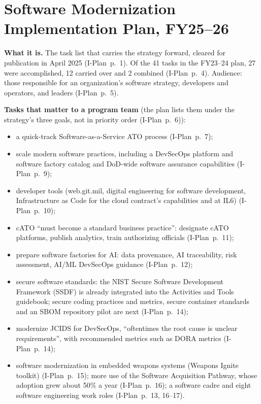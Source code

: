 \documentclass[11pt,letterpaper,twoside,openany]{memoir}
\newcommand{\pg}[2]{{\small(#1~p.~#2)}}          %
\begin{document}
\section{Software Modernization Implementation Plan, FY25--26}
\textbf{What it is.} The task list that carries the strategy forward, cleared for publication in April 2025
\pg{I-Plan}{1}. Of the 41 tasks in the FY23--24 plan, 27 were accomplished, 12 carried over and 2 combined
\pg{I-Plan}{4}. Audience: those responsible for an organization's software strategy, developers and operators, and
leaders \pg{I-Plan}{5}.

\textbf{Tasks that matter to a program team} (the plan lists them under the strategy's three goals, not in priority
order \pg{I-Plan}{6}):
\begin{itemize}
\item a quick-track Software-as-a-Service ATO process \pg{I-Plan}{7};
\item scale modern software practices, including a DevSecOps platform and software factory catalog and DoD-wide
  software assurance capabilities \pg{I-Plan}{9};
\item developer tools (web.git.mil, digital engineering for software development, Infrastructure as Code for the cloud
  contract's capabilities and at IL6) \pg{I-Plan}{10};
\item cATO ``must become a standard business practice'': designate cATO platforms, publish analytics, train
  authorizing officials \pg{I-Plan}{11};
\item prepare software factories for AI: data provenance, AI traceability, risk assessment, AI/ML DevSecOps guidance
  \pg{I-Plan}{12};
\item secure software standards: the NIST Secure Software Development Framework (SSDF) is already integrated into the
  Activities and Tools guidebook; secure coding practices and metrics, secure container standards and an SBOM
  repository pilot are next \pg{I-Plan}{14};
\item modernize JCIDS for DevSecOps, ``oftentimes the root cause is unclear requirements'', with recommended metrics
  such as DORA metrics \pg{I-Plan}{14};
\item software modernization in embedded weapons systems (Weapons Ignite toolkit) \pg{I-Plan}{15}; more use of the
  Software Acquisition Pathway, whose adoption grew about 50\% a year \pg{I-Plan}{16}; a software cadre and eight
  software engineering work roles \pg{I-Plan}{13, 16--17}.
\end{itemize}
\end{document}
